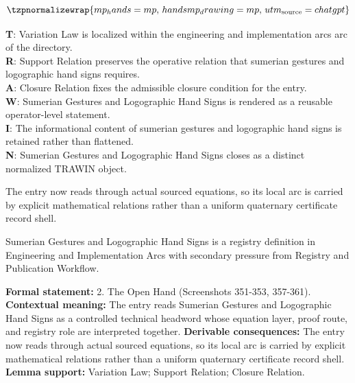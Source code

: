 \begin{minipage}[t]{0.48\linewidth}
\[
\tzpnormalizewrap{mp_hands = mp,\,hands mp_drawing = mp,\,utm_{\mathrm{source}}=chatgpt}
\]

\small
\textbf{T}: Variation Law is localized within the engineering and implementation arcs arc of the directory.\\
\textbf{R}: Support Relation preserves the operative relation that sumerian gestures and logographic hand signs requires.\\
\textbf{A}: Closure Relation fixes the admissible closure condition for the entry.\\
\textbf{W}: Sumerian Gestures and Logographic Hand Signs is rendered as a reusable operator-level statement.\\
\textbf{I}: The informational content of sumerian gestures and logographic hand signs is retained rather than flattened.\\
\textbf{N}: Sumerian Gestures and Logographic Hand Signs closes as a distinct normalized TRAWIN object.
\normalsize
\end{minipage}

The entry now reads through actual sourced equations, so its local arc is carried by explicit mathematical relations rather than a uniform quaternary certificate record shell.
\clearpage


\begingroup\small
{}
Sumerian Gestures and Logographic Hand Signs is a registry definition in Engineering and Implementation Arcs with secondary pressure from Registry and Publication Workflow.

\begingroup\footnotesize\setlength{\emergencystretch}{3em}\sloppy
\textbf{Formal statement:} 2. The Open Hand (Screenshots 351-353, 357-361). \textbf{Contextual meaning:} The entry reads Sumerian Gestures and Logographic Hand Signs as a controlled technical headword whose equation layer, proof route, and registry role are interpreted together. \textbf{Derivable consequences:} The entry now reads through actual sourced equations, so its local arc is carried by explicit mathematical relations rather than a uniform quaternary certificate record shell. \textbf{Lemma support:} Variation Law; Support Relation; Closure Relation.\par
\endgroup

